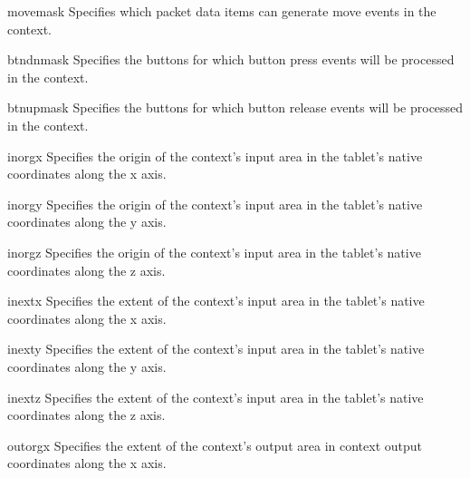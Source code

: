 \begin{memberdesc}{movemask}
Specifies which packet data items can generate move events in the context.
\end{memberdesc}

\begin{memberdesc}{btndnmask}
Specifies the buttons for which button press events will be processed
in the context.
\end{memberdesc}

\begin{memberdesc}{btnupmask}
Specifies the buttons for which button release events will be processed
in the context.
\end{memberdesc}

\begin{memberdesc}{inorgx}
Specifies the origin of the context's input area in the tablet's
native coordinates along the x axis.
\end{memberdesc}

\begin{memberdesc}{inorgy}
Specifies the origin of the context's input area in the tablet's
native coordinates along the y axis.
\end{memberdesc}

\begin{memberdesc}{inorgz}
Specifies the origin of the context's input area in the tablet's
native coordinates along the z axis.
\end{memberdesc}

\begin{memberdesc}{inextx}
Specifies the extent of the context's input area in the tablet's native
coordinates along the x axis.
\end{memberdesc}

\begin{memberdesc}{inexty}
Specifies the extent of the context's input area in the tablet's native
coordinates along the y axis.
\end{memberdesc}

\begin{memberdesc}{inextz}
Specifies the extent of the context's input area in the tablet's native
coordinates along the z axis.
\end{memberdesc}

\begin{memberdesc}{outorgx}
Specifies the extent of the context's output area in context output
coordinates along the x axis.
\end{memberdesc}

